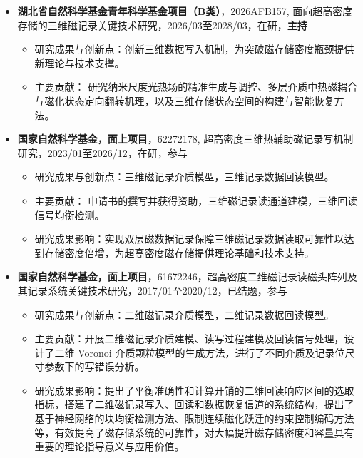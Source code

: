 \documentclass[zh]{resume}
\begin{document}
\begin{itemize}
  \item \textbf{湖北省自然科学基金青年科学基金项目（B类）}，2026AFB157, 面向超高密度存储的三维磁记录关键技术研究，2026/03至2028/03，在研，\textbf{主持}
  \begin{itemize}
    \item 研究成果与创新点：创新三维数据写入机制，为突破磁存储密度瓶颈提供新理论与技术支撑。
    \item 主要贡献： 研究纳米尺度光热场的精准生成与调控、多层介质中热磁耦合与磁化状态定向翻转机理，以及三维存储状态空间的构建与智能恢复方法。
  \end{itemize}

  \item \textbf{国家自然科学基金，面上项目}，62272178, 超高密度三维热辅助磁记录写机制研究，2023/01至2026/12，在研，参与
  \begin{itemize}
    \item 研究成果与创新点：三维磁记录介质模型，三维记录数据回读模型。
    \item 主要贡献： 申请书的撰写并获得资助，三维磁记录读通道建模，三维回读信号均衡检测。
    \item 研究成果影响：实现双层磁数据记录保障三维磁记录数据读取可靠性以达到存储密度倍增，为超高密度磁存储提供理论基础和技术支持。
  \end{itemize}

  \item \textbf{国家自然科学基金，面上项目}，61672246，超高密度二维磁记录读磁头阵列及其记录系统关键技术研究，2017/01至2020/12，已结题，参与
  \begin{itemize}
    \item 研究成果与创新点：二维磁记录介质模型，二维记录数据回读模型。
    \item 主要贡献：开展二维磁记录介质建模、读写过程建模及回读信号处理，设计了二维 Voronoi 介质颗粒模型的生成方法，进行了不同介质及记录位尺寸参数下的写错误分析。
    \item 研究成果影响：提出了平衡准确性和计算开销的二维回读响应区间的选取指标，搭建了二维磁记录写入、回读和数据恢复信道的系统结构，提出了基于神经网络的块均衡检测方法、限制连续磁化跃迁的约束控制编码方法等，有效提高了磁存储系统的可靠性，对大幅提升磁存储密度和容量具有重要的理论指导意义与应用价值。
  \end{itemize}


\end{itemize}
\end{document}
